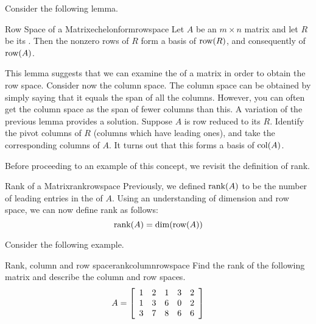 Consider the following lemma. 

\begin{lemma}{Row Space of a {\EF} Matrix}{echelonformrowspace}
Let $A$ be an $m \times n$ matrix and let $R$ be its {\ef}. Then the nonzero rows of $R$ form a basis of $\mbox{row}(R)$, and consequently of $\mbox{row}(A)$. 
\end{lemma}

This lemma suggests that we can examine the {\ef} of a matrix in order to obtain the row space. Consider now the column space. The column space can be obtained by simply saying that
it equals the span of all the columns. However, you can often get the column
space as the span of fewer columns than this. A variation of the previous lemma provides a solution. Suppose $A$ is row reduced to its {\ef} $R$. Identify the pivot columns of $R$ (columns which have leading ones), and take the corresponding columns of $A$. It turns out that this forms a basis of $\mbox{col}(A)$. 

Before proceeding to an example of this concept, we revisit the definition of rank. 

\begin{definition}{Rank of a Matrix}{rankrowspace}
Previously, we defined $\mbox{rank}(A)$ to be the number of leading entries in the {\ef} of $A$. Using an understanding of dimension and row space, we can now define rank as follows:
\[
\mbox{rank}(A) = \dim(\mbox{row}(A))
\]
\end{definition}

Consider the following example. 

\begin{example}{Rank, column and row space}{rankcolumnrowspace}
Find the rank of the following matrix and describe the column and row spaces.
\begin{equation*}
A = 
\left[
\begin{array}{rrrrr}
1 & 2 & 1 & 3 & 2 \\
1 & 3 & 6 & 0 & 2 \\
3 & 7 & 8 & 6 & 6
\end{array}
\right]  
\end{equation*}
\end{example}

